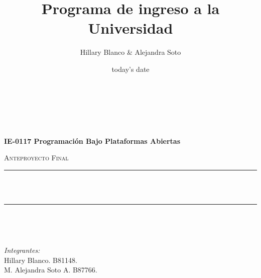 \documentclass[12pt]{report}
\title{Programa de ingreso a la Universidad}%
\author{Hillary Blanco & Alejandra Soto}%
\date{today's date}
\makeatletter
\let\thetitle\@title
\makeatother
\begin{document}

\begin{titlepage}
	\centering
    \vspace*{0.5 cm}

\begin{center}    \\[0 cm]	\end{center}%
\begin{center}    \\[1 cm]	\end{center}%
\begin{center}    \textbf{\Large   IE-0117 Programación Bajo Plataformas Abiertas}\\[2.0 cm]	\end{center}%
	\textsc{\Large Anteproyecto Final}\\[0.5 cm]				%
	\rule{\linewidth}{0.2 mm} \\[0.4 cm]
	{ \huge \bfseries \thetitle}\\
	\rule{\linewidth}{0.2 mm} \\[1.5 cm]
	
	\begin{minipage}{0.4\textwidth}
		\begin{flushleft} \large
			\end{flushleft}
			\end{minipage}~
			\begin{minipage}{0.4\textwidth}
            
			\begin{flushright} \large
			\emph{Integrantes:} \\
			Hillary Blanco. B81148. \\
			M. Alejandra Soto A. B87766.\\
		\end{flushright}
           
	\end{minipage}\\[2 cm]
	
    
	
\end{titlepage}
\end{document}
